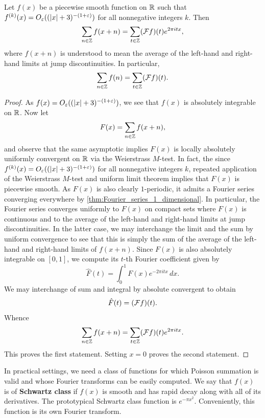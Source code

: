     \begin{theorem}
      Let \(f(x)\) be a piecewise smooth function on \(\mathbb{R}\) such that \(f^{(k)}(x) = O_{\varepsilon}((|x|+3)^{-(1+\varepsilon)})\) for all nonnegative integers \(k\). Then
      \[
        \sum_{n \in \mathbb{Z}}f(x+n) = \sum_{t \in \mathbb{Z}}(\mathcal{F}f)(t)e^{2\pi itx},
      \]
      where \(f(x+n)\) is understood to mean the average of the left-hand and right-hand limits at jump discontinuities. In particular,
      \[
        \sum_{n \in \mathbb{Z}}f(n) = \sum_{t \in \mathbb{Z}}(\mathcal{F}f)(t).
      \]
    \end{theorem}
    \begin{proof}
      As \(f(x) = O_{\varepsilon}((|x|+3)^{-(1+\varepsilon)})\), we see that \(f(x)\) is absolutely integrable on \(\mathbb{R}\). Now let
      \[
        F(x) = \sum_{n \in \mathbb{Z}}f(x+n),
      \]
      and observe that the same asymptotic implies \(F(x)\) is locally absolutely uniformly convergent on \(\mathbb{R}\) via the Weierstrass \(M\)-test. In fact, the since \(f^{(k)}(x) = O_{\varepsilon}((|x|+3)^{-(1+\varepsilon)})\) for all nonnegative integers \(k\), repeated application of the Weierstrass \(M\)-test and uniform limit theorem implies that \(F(x)\) is piecewise smooth. As \(F(x)\) is also clearly \(1\)-periodic, it admits a Fourier series converging everywhere by \cref{thm:Fourier_series_1_dimensional}. In particular, the Fourier series converges uniformly to \(F(x)\) on compact sets where \(F(x)\) is continuous and to the average of the left-hand and right-hand limits at jump discontinuities. In the latter case, we may interchange the limit and the sum by uniform convergence to see that this is simply the sum of the average of the left-hand and right-hand limits of \(f(x+n)\). Since \(F(x)\) is also absolutely integrable on \([0,1]\), we compute its \(t\)-th Fourier coefficient given by
      \[
        \hat{F}(t) = \int_{0}^{1}F(x)e^{-2\pi itx}\,dx.
      \]
      We may interchange of sum and integral by absolute convergent to obtain
      \[
        \hat{F}(t) = (\mathcal{F}f)(t).
      \]
      Whence
      \[
        \sum_{n \in \mathbb{Z}}f(x+n) = \sum_{t \in \mathbb{Z}}(\mathcal{F}f)(t)e^{2\pi itx}.
      \]
      This proves the first statement. Setting \(x = 0\) proves the second statement.
    \end{proof}

    In practical settings, we need a class of functions for which Poisson summation is valid and whose Fourier transforms can be easily computed. We say that \(f(x)\) is of \textbf{Schwartz class} if \(f(x)\) is smooth and has rapid decay along with all of its derivatives. The prototypical Schwartz class function is \(e^{-\pi x^{2}}\). Conveniently, this function is its own Fourier transform.

